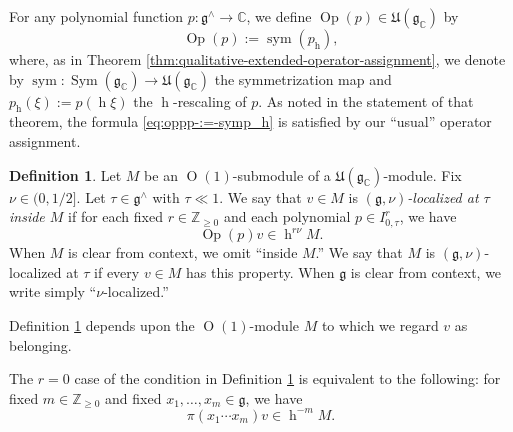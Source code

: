 \documentclass[reqno]{amsart}
\DeclareMathOperator{\h}{h}
\DeclareMathOperator{\Sym}{Sym}
\def\O{\operatorname{O}}
\DeclareMathOperator{\Opp}{Op}
\DeclareMathOperator{\sym}{sym}
\theoremstyle{plain} \newtheorem{theorem} {Theorem}
\theoremstyle{definition} \newtheorem{definition} [theorem] {Definition}
\theoremstyle{itplain} %
\numberwithin{equation}{section}
\numberwithin{theorem}{section}
\renewcommand{\geq}{\geqslant}
\begin{document}
For any polynomial function $p : \mathfrak{g}^\wedge \rightarrow \mathbb{C}$, we define $\Opp(p) \in \mathfrak{U}(\mathfrak{g}_\mathbb{C})$ by
\begin{equation}\label{eq:oppp-:=-symp_h}
  \Opp(p) := \sym(p_{\h}),
\end{equation}
where, as in Theorem \ref{thm:qualitative-extended-operator-assignment}, we denote by $\sym : \Sym(\mathfrak{g}_\mathbb{C}) \rightarrow \mathfrak{U}(\mathfrak{g}_\mathbb{C})$ the symmetrization map and $p_{\h}(\xi) := p(\h \xi)$ the $\h$-rescaling of $p$.  As noted in the statement of that theorem, the formula \eqref{eq:oppp-:=-symp_h} is satisfied by our ``usual'' operator assignment.  

\begin{definition}\label{defn:localized-vectors}
  Let $M$ be an $\O(1)$-submodule of a $\mathfrak{U}(\mathfrak{g}_\mathbb{C})$-module.  Fix $\nu \in (0,1/2]$.  Let $\tau \in \mathfrak{g}^\wedge$ with $\tau \ll 1$.  We say that $v \in M$ is \emph{$(\mathfrak{g},\nu)$-localized at $\tau$ inside $M$} if for each fixed $r \in \mathbb{Z}_{\geq 0}$ and each polynomial $p \in I_{0,\tau}^r$, we have
  \[
    \Opp(p) v \in \h^{r \nu} M.
  \]
  When $M$ is clear from context, we omit ``inside $M$.''  We say that $M$ is $(\mathfrak{g},\nu)$-localized at $\tau$ if every $v \in M$ has this property.  When $\mathfrak{g}$ is clear from context, we write simply ``$\nu$-localized.''
\end{definition}
\begin{remark}
  Definition \ref{defn:localized-vectors} depends upon the $\O(1)$-module $M$ to which we regard $v$ as belonging.
\end{remark}
\begin{remark}\label{rmk:r-=-0}
  The $r = 0$ case of the condition in Definition \ref{defn:localized-vectors} is equivalent to the following: for fixed $m \in \mathbb{Z}_{\geq 0}$ and fixed $x_1,\dotsc,x_m \in \mathfrak{g}$, we have
  \begin{equation*}
    \pi(x_1 \dotsb x_m) v \in \h^{-m} M.
  \end{equation*}
\end{remark}
\end{document}
